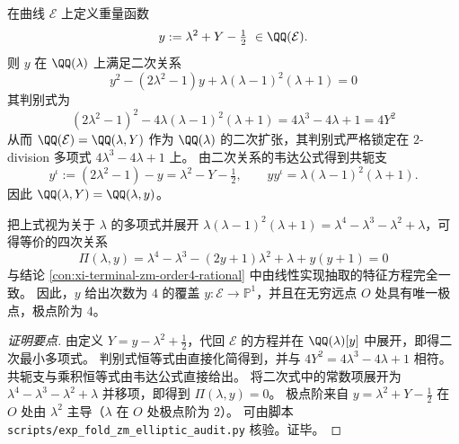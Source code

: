 \begin{conclusion}[重量坐标的二次扩张判别式与四次谱方程的函数域实现]\label{con:xi-terminal-zm-elliptic-quadratic-discriminant}
在曲线 \(\mathcal{E}\) 上定义重量函数
\[
y:=\lambda^{2}+Y-\tfrac12\ \in\QQ(\mathcal{E}).
\]
则 \(y\) 在 \(\QQ(\lambda)\) 上满足二次关系
\[
\boxed{\;
y^{2}-(2\lambda^{2}-1)y+\lambda(\lambda-1)^{2}(\lambda+1)=0\;}
\]
其判别式为
\[
\boxed{\;
(2\lambda^{2}-1)^{2}-4\lambda(\lambda-1)^{2}(\lambda+1)=4\lambda^{3}-4\lambda+1=4Y^{2}\;}
\]
从而 \(\QQ(\mathcal{E})=\QQ(\lambda,Y)\) 作为 \(\QQ(\lambda)\) 的二次扩张，其判别式严格锁定在 \(2\)-division 多项式 \(4\lambda^{3}-4\lambda+1\) 上。
由二次关系的韦达公式得到共轭支
\[
y^{\iota}:=(2\lambda^{2}-1)-y=\lambda^{2}-Y-\tfrac12,
\qquad
yy^{\iota}=\lambda(\lambda-1)^{2}(\lambda+1).
\]
因此 \(\QQ(\lambda,Y)=\QQ(\lambda,y)\)。
\par
把上式视为关于 \(\lambda\) 的多项式并展开 \(\lambda(\lambda-1)^{2}(\lambda+1)=\lambda^{4}-\lambda^{3}-\lambda^{2}+\lambda\)，可得等价的四次关系
\[
\boxed{\;
\Pi(\lambda,y)=\lambda^{4}-\lambda^{3}-(2y+1)\lambda^{2}+\lambda+y(y+1)=0\;}
\]
与结论 \ref{con:xi-terminal-zm-order4-rational} 中由线性实现抽取的特征方程完全一致。
因此，\(y\) 给出次数为 \(4\) 的覆盖 \(y:\mathcal{E}\to\mathbb{P}^{1}\)，并且在无穷远点 \(O\) 处具有唯一极点，极点阶为 \(4\)。
\end{conclusion}
\begin{proof}[证明要点]
由定义 \(Y=y-\lambda^{2}+\tfrac12\)，代回 \(\mathcal{E}\) 的方程并在 \(\QQ(\lambda)[y]\) 中展开，即得二次最小多项式。
判别式恒等式由直接化简得到，并与 \(4Y^{2}=4\lambda^{3}-4\lambda+1\) 相符。
共轭支与乘积恒等式由韦达公式直接给出。
将二次式中的常数项展开为 \(\lambda^{4}-\lambda^{3}-\lambda^{2}+\lambda\) 并移项，即得到 \(\Pi(\lambda,y)=0\)。
极点阶来自 \(y=\lambda^{2}+Y-\tfrac12\) 在 \(O\) 处由 \(\lambda^{2}\) 主导（\(\lambda\) 在 \(O\) 处极点阶为 \(2\)）。
可由脚本 \texttt{scripts/exp\_fold\_zm\_elliptic\_audit.py} 核验。证毕。
\end{proof}



